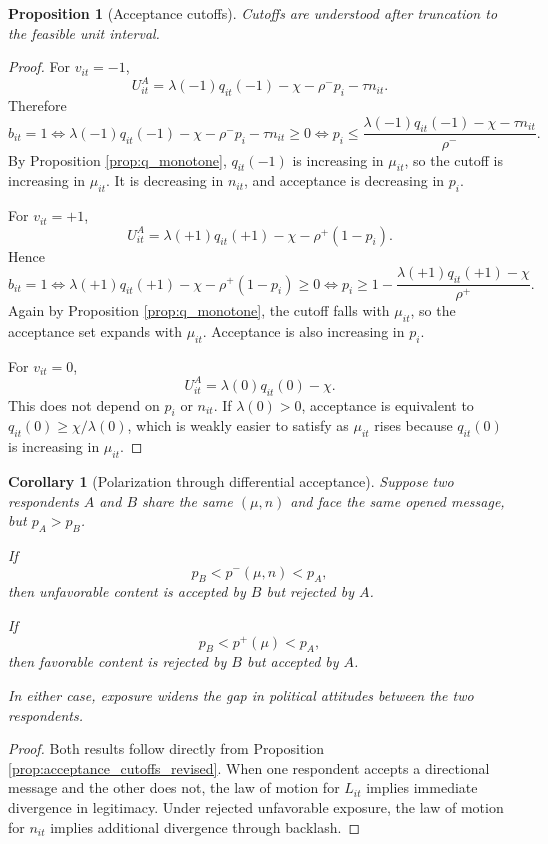 \documentclass[12pt,american]{article}
\newtheorem{proposition}{Proposition}
\newtheorem{corollary}{Corollary}
\begin{document}
\begin{refsection}
\begin{proposition}[Acceptance cutoffs]
			Cutoffs are understood after truncation to the feasible unit interval.
		\end{proposition}
		
		\begin{proof}
			For \(v_{it}=-1\),
			\[
			U_{it}^{A}=\lambda(-1)q_{it}(-1)-\chi-\rho^-p_i-\tau n_{it}.
			\]
			Therefore
			\[
			b_{it}=1
			\iff
			\lambda(-1)q_{it}(-1)-\chi-\rho^-p_i-\tau n_{it}\ge 0
			\iff
			p_i\le \frac{\lambda(-1)q_{it}(-1)-\chi-\tau n_{it}}{\rho^-}.
			\]
			By Proposition \ref{prop:q_monotone}, \(q_{it}(-1)\) is increasing in \(\mu_{it}\), so the cutoff is increasing in \(\mu_{it}\). It is decreasing in \(n_{it}\), and acceptance is decreasing in \(p_i\).
			
			For \(v_{it}=+1\),
			\[
			U_{it}^{A}=\lambda(+1)q_{it}(+1)-\chi-\rho^+(1-p_i).
			\]
			Hence
			\[
			b_{it}=1
			\iff
			\lambda(+1)q_{it}(+1)-\chi-\rho^+(1-p_i)\ge 0
			\iff
			p_i\ge 1-\frac{\lambda(+1)q_{it}(+1)-\chi}{\rho^+}.
			\]
			Again by Proposition \ref{prop:q_monotone}, the cutoff falls with \(\mu_{it}\), so the acceptance set expands with \(\mu_{it}\). Acceptance is also increasing in \(p_i\).
			
			For \(v_{it}=0\),
			\[
			U_{it}^{A}=\lambda(0)q_{it}(0)-\chi.
			\]
			This does not depend on \(p_i\) or \(n_{it}\). If \(\lambda(0)>0\), acceptance is equivalent to \(q_{it}(0)\ge \chi/\lambda(0)\), which is weakly easier to satisfy as \(\mu_{it}\) rises because \(q_{it}(0)\) is increasing in \(\mu_{it}\).
		\end{proof}
		
		\begin{corollary}[Polarization through differential acceptance]
			\label{cor:polarization_revised}
			Suppose two respondents \(A\) and \(B\) share the same \((\mu,n)\) and face the same opened message, but \(p_A>p_B\).
			
			If
			\[
			p_B<p^{-}(\mu,n)<p_A,
			\]
			then unfavorable content is accepted by \(B\) but rejected by \(A\).
			
			If
			\[
			p_B<p^{+}(\mu)<p_A,
			\]
			then favorable content is rejected by \(B\) but accepted by \(A\).
			
			In either case, exposure widens the gap in political attitudes between the two respondents.
		\end{corollary}
		
		\begin{proof}
			Both results follow directly from Proposition \ref{prop:acceptance_cutoffs_revised}. When one respondent accepts a directional message and the other does not, the law of motion for \(L_{it}\) implies immediate divergence in legitimacy. Under rejected unfavorable exposure, the law of motion for \(n_{it}\) implies additional divergence through backlash.
		\end{proof}
		

\end{refsection}
\end{document}
